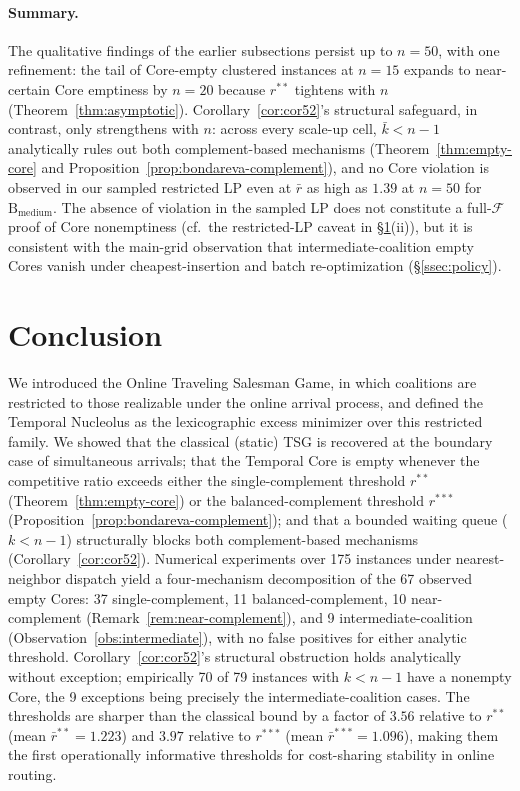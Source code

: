 \documentclass[11pt]{article}
\theoremstyle{plain}
\theoremstyle{definition}
\theoremstyle{remark}
\newcommand{\F}{\mathcal{F}}
\begin{document}
\paragraph{Summary.} The qualitative findings of the earlier subsections persist up to $n=50$, with one refinement: the tail of Core-empty clustered instances at $n=15$ expands to near-certain Core emptiness by $n=20$ because $r^{\ast\ast}$ tightens with $n$ (Theorem~\ref{thm:asymptotic}). Corollary~\ref{cor:cor52}'s structural safeguard, in contrast, only strengthens with $n$: across every scale-up cell, $\bar k<n-1$ analytically rules out both complement-based mechanisms (Theorem~\ref{thm:empty-core} and Proposition~\ref{prop:bondareva-complement}), and no Core violation is observed in our sampled restricted LP even at $\bar r$ as high as $1.39$ at $n=50$ for $\text{B}_{\text{medium}}$. The absence of violation in the sampled LP does not constitute a full-$\F$ proof of Core nonemptiness (cf.\ the restricted-LP caveat in \S\ref{sec:conclusion}(ii)), but it is consistent with the main-grid observation that intermediate-coalition empty Cores vanish under cheapest-insertion and batch re-optimization (\S\ref{ssec:policy}).

\section{Conclusion}
\label{sec:conclusion}

We introduced the Online Traveling Salesman Game, in which coalitions are restricted to those realizable under the online arrival process, and defined the Temporal Nucleolus as the lexicographic excess minimizer over this restricted family. We showed that the classical (static) TSG is recovered at the boundary case of simultaneous arrivals; that the Temporal Core is empty whenever the competitive ratio exceeds either the single-complement threshold $r^{\ast\ast}$ (Theorem~\ref{thm:empty-core}) or the balanced-complement threshold $r^{\ast\ast\ast}$ (Proposition~\ref{prop:bondareva-complement}); and that a bounded waiting queue ($k<n-1$) structurally blocks both complement-based mechanisms (Corollary~\ref{cor:cor52}). Numerical experiments over 175 instances under nearest-neighbor dispatch yield a four-mechanism decomposition of the 67 observed empty Cores: 37 single-complement, 11 balanced-complement, 10 near-complement (Remark~\ref{rem:near-complement}), and 9 intermediate-coalition (Observation~\ref{obs:intermediate}), with no false positives for either analytic threshold. Corollary~\ref{cor:cor52}'s structural obstruction holds analytically without exception; empirically 70 of 79 instances with $k<n-1$ have a nonempty Core, the 9 exceptions being precisely the intermediate-coalition cases. The thresholds are sharper than the classical bound by a factor of $3.56$ relative to $r^{\ast\ast}$ (mean $\bar r^{\ast\ast}=1.223$) and $3.97$ relative to $r^{\ast\ast\ast}$ (mean $\bar r^{\ast\ast\ast}=1.096$), making them the first operationally informative thresholds for cost-sharing stability in online routing.
\end{document}
